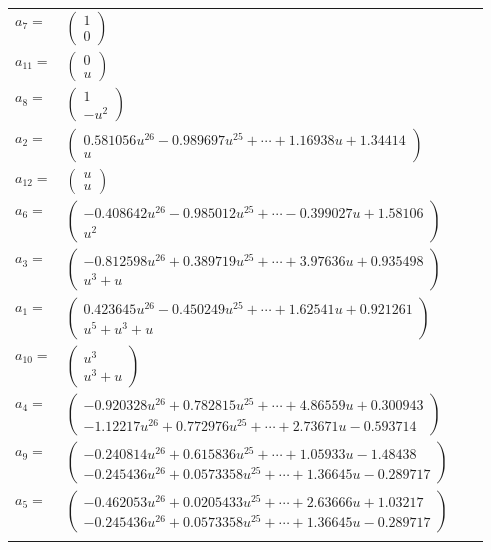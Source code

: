 \documentclass[1p]{elsarticle_modified}
\theoremstyle{definition}
\begin{document}
\begin{tabular}{m{7pt} m{180pt} m{7pt} m{180pt} }
\flushright $a_{7}=$&$\begin{pmatrix}1\\0\end{pmatrix}$ \\
\flushright $a_{11}=$&$\begin{pmatrix}0\\u\end{pmatrix}$ \\
\flushright $a_{8}=$&$\begin{pmatrix}1\\- u^2\end{pmatrix}$ \\
\flushright $a_{2}=$&$\begin{pmatrix}0.581056 u^{26}-0.989697 u^{25}+\cdots+1.16938 u+1.34414\\u\end{pmatrix}$ \\
\flushright $a_{12}=$&$\begin{pmatrix}u\\u\end{pmatrix}$ \\
\flushright $a_{6}=$&$\begin{pmatrix}-0.408642 u^{26}-0.985012 u^{25}+\cdots-0.399027 u+1.58106\\u^2\end{pmatrix}$ \\
\flushright $a_{3}=$&$\begin{pmatrix}-0.812598 u^{26}+0.389719 u^{25}+\cdots+3.97636 u+0.935498\\u^3+u\end{pmatrix}$ \\
\flushright $a_{1}=$&$\begin{pmatrix}0.423645 u^{26}-0.450249 u^{25}+\cdots+1.62541 u+0.921261\\u^5+u^3+u\end{pmatrix}$ \\
\flushright $a_{10}=$&$\begin{pmatrix}u^3\\u^3+u\end{pmatrix}$ \\
\flushright $a_{4}=$&$\begin{pmatrix}-0.920328 u^{26}+0.782815 u^{25}+\cdots+4.86559 u+0.300943\\-1.12217 u^{26}+0.772976 u^{25}+\cdots+2.73671 u-0.593714\end{pmatrix}$ \\
\flushright $a_{9}=$&$\begin{pmatrix}-0.240814 u^{26}+0.615836 u^{25}+\cdots+1.05933 u-1.48438\\-0.245436 u^{26}+0.0573358 u^{25}+\cdots+1.36645 u-0.289717\end{pmatrix}$ \\
\flushright $a_{5}=$&$\begin{pmatrix}-0.462053 u^{26}+0.0205433 u^{25}+\cdots+2.63666 u+1.03217\\-0.245436 u^{26}+0.0573358 u^{25}+\cdots+1.36645 u-0.289717\end{pmatrix}$\\&\end{tabular}
\end{document}
